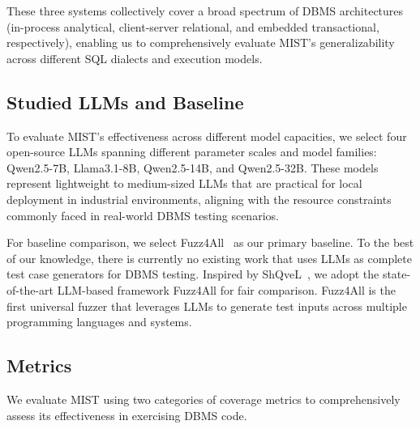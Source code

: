 These three systems collectively cover a broad spectrum of DBMS architectures (in-process analytical, client-server relational, and embedded transactional, respectively), enabling us to comprehensively evaluate MIST's generalizability across different SQL dialects and execution models.



\subsection{Studied LLMs and Baseline}

To evaluate MIST's effectiveness across different model capacities, we select four open-source LLMs spanning different parameter scales and model families: Qwen2.5-7B, Llama3.1-8B, Qwen2.5-14B, and Qwen2.5-32B. These models represent lightweight to medium-sized LLMs that are practical for local deployment in industrial environments, aligning with the resource constraints commonly faced in real-world DBMS testing scenarios.

For baseline comparison, we select Fuzz4All~\cite{fuzz4all} as our primary baseline. To the best of our knowledge, there is currently no existing work that uses LLMs as complete test case generators for DBMS testing. Inspired by ShQveL~\cite{zhong2025testing}, we adopt the state-of-the-art LLM-based framework Fuzz4All for fair comparison. Fuzz4All is the first universal fuzzer that leverages LLMs to generate test inputs across multiple programming languages and systems.  

\subsection{Metrics}

We evaluate MIST using two categories of coverage metrics to comprehensively assess its effectiveness in exercising DBMS code.

